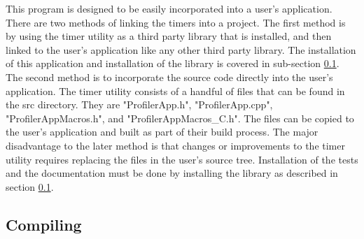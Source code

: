 \documentclass[fleqn,10pt,letterpaper]{article}
\begin{document}
This program is designed to be easily incorporated into a user's application.  
There are two methods of linking the timers into a project.  The first method 
is by using the timer utility as a third party library that is installed, and 
then linked to the user's application like any other third party library.  
The installation of this application and installation of the library is covered
in sub-section \ref{sec:install_library}.  The second method is to incorporate 
the source code directly into the user's application.  The timer utility consists
of a handful of files that can be found in the src directory.  They are 
"ProfilerApp.h", "ProfilerApp.cpp", "ProfilerAppMacros.h", and "ProfilerAppMacros\_C.h".
The files can be copied to the user's application and built as part of their 
build process.  The major disadvantage to the later method is that changes or
improvements to the timer utility requires replacing the files in the user's 
source tree.  Installation of the tests and the documentation must be done by 
installing the library as described in section \ref{sec:install_library}. 

\subsection{Compiling}  \label{sec:install_library}
\end{document}
